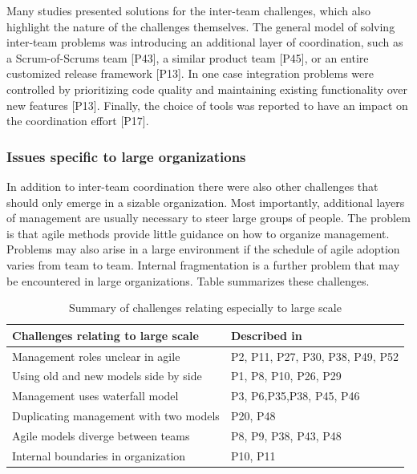 \documentclass[preprint,authoryear,12pt]{elsarticle}
\begin{document}
Many studies presented solutions for the inter-team challenges, which also
highlight the nature of the challenges themselves. The general model of solving
inter-team problems was introducing an additional layer of coordination, such as
a Scrum-of-Scrums team [P43], a similar product team [P45], or an entire
customized release framework [P13]. In one case integration problems were
controlled by prioritizing code quality and maintaining existing functionality
over new features [P13]. Finally, the choice of tools was reported to have an
impact on the coordination effort [P17].



\subsubsection{Issues specific to large organizations}

In addition to inter-team coordination there were also other challenges that
should only emerge in a sizable organization.
Most importantly, additional layers of management are usually necessary to steer
large groups of people. The problem is that agile methods provide little
guidance on how to organize management.
Problems may also arise in a large environment if the schedule of agile adoption
varies from team to team. Internal fragmentation is a further problem that may
be encountered in large organizations.
Table \label{table:challenges_largescale} summarizes these challenges.

\begin{table}[b]
    \centering
    \begin{tabular}{ >{\raggedright\arraybackslash}p{}
                     >{\raggedright\arraybackslash}p{} }
        \toprule
        Challenges relating to large scale  &  Described in \\
        \midrule
        Management roles unclear in agile       &  P2, P11, P27, P30, P38, P49, P52 \\
        Using old and new models side by side   &  P1, P8, P10, P26, P29 \\
        Management uses waterfall model         &  P3, P6,P35,P38, P45, P46  \\
        Duplicating management with two models  &  P20, P48 \\
        Agile models diverge between teams      &  P8, P9, P38, P43, P48 \\
        Internal boundaries in organization     &  P10, P11 \\
        \bottomrule
    \end{tabular}
    \caption{Summary of challenges relating especially to large scale}
    \label{table:challenges_largescale}
\end{table}
\end{document}
